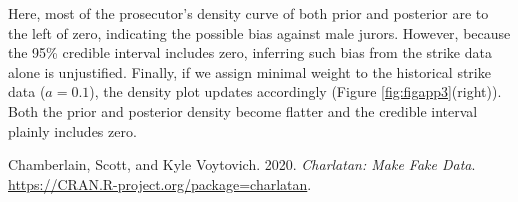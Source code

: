 \documentclass[12pt]{article}
\newlength{\cslhangindent}
\newlength{\cslentryspacingunit} %
\newenvironment{CSLReferences}[2] %
 {%
  \setlength{\parindent}{0pt}
  \ifodd #1
  \let\oldpar\par
  \def\par{\hangindent=\cslhangindent\oldpar}
  \fi
  \setlength{\parskip}{#2\cslentryspacingunit}
 }%
 {}
\begin{document}
Here, most of the prosecutor's density curve of both prior and posterior are to the left of zero, indicating the possible bias against male jurors. However, because the 95\% credible interval includes zero, inferring such bias from the strike data alone is unjustified. Finally, if we assign minimal weight to the historical strike data (\(a = 0.1\)), the density plot updates accordingly (Figure \ref{fig:figapp3}(right)). Both the prior and posterior density become flatter and the credible interval plainly includes zero.

\hypertarget{refs}{}
\begin{CSLReferences}{1}{0}
\leavevmode{}%
Chamberlain, Scott, and Kyle Voytovich. 2020. \emph{Charlatan: Make Fake Data}. \url{https://CRAN.R-project.org/package=charlatan}.

\end{CSLReferences}
\end{document}
